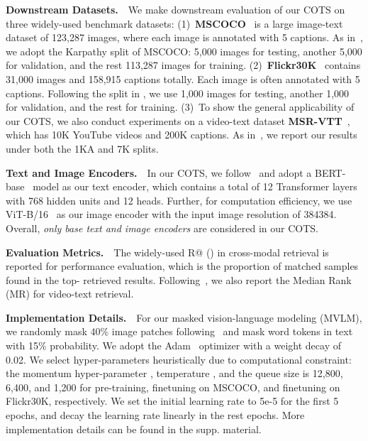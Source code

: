 \documentclass[10pt,twocolumn,letterpaper]{article}
\begin{document}
\noindent\textbf{Downstream Datasets.}~~We make downstream evaluation of our COTS on three widely-used benchmark datasets: (1)~\textbf{MSCOCO}~\cite{lin2014microsoft} is a large image-text dataset of 123,287 images, where each image is annotated with 5 captions. As in~\cite{kim2021vilt}, we adopt the Karpathy split of MSCOCO: 5,000 images for testing, another 5,000 for validation, and the rest 113,287 images for training. (2)~\textbf{Flickr30K}~\cite{plummer2015flickr30k} contains 31,000 images and 158,915 captions totally. Each image is often annotated with 5 captions. Following the split in \cite{frome2013devise}, we use 1,000 images for testing, another 1,000 for validation, and the rest for training. (3)~To show the general applicability of our COTS, we also conduct experiments on a video-text dataset \textbf{MSR-VTT}~\cite{xu2016msr}, which has 10K YouTube videos and 200K captions. As in~\cite{yang2021taco}, we report our results under both the 1KA and 7K splits.

\noindent\textbf{Text and Image Encoders.}~~In our COTS, we follow~\cite{sun2021lightningdot} and adopt a BERT-base~\cite{devlin2018bert} model as our text encoder, which contains a total of 12 Transformer layers with 768 hidden units and 12 heads. Further, for computation efficiency, we use ViT-B/16~\cite{dosovitskiy2021an} as our image encoder with the input image resolution of 384384. Overall, \emph{only base text and image encoders} are considered in our COTS.

\noindent\textbf{Evaluation Metrics.}~~The widely-used R@ () in cross-modal retrieval is reported for performance evaluation, which is the proportion of matched samples found in the top- retrieved results. Following~\cite{bain2021frozen}, we also report the Median Rank (MR) for video-text retrieval.

\noindent\textbf{Implementation Details.}~~For our masked vision-language modeling (MVLM), we randomly mask 40\% image patches following~\cite{bao2021beit} and mask word tokens in text with 15\% probability. 
We adopt the Adam~\cite{kingma2014adam} optimizer with a weight decay of 0.02. We select hyper-parameters heuristically due to computational constraint: the momentum hyper-parameter , temperature , and the queue size  is 12,800, 6,400, and 1,200 for pre-training, finetuning on MSCOCO, and finetuning on Flickr30K, respectively. 
We set the initial learning rate to 5e-5 for the first 5 epochs, and decay the learning rate linearly in the rest epochs.
More implementation details can be found in the supp. material.
\end{document}

